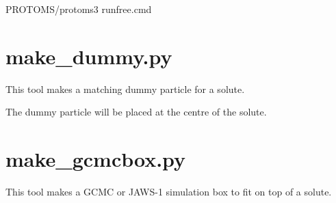 \documentclass[letterpaper,10pt,english]{sphinxmanual}
\begin{document}
%
\begin{sphinxVerbatim}[commandchars=\\\{\}]
\PYGZdl{}PROTOMS/protoms3 run\PYGZus{}free.cmd
\end{sphinxVerbatim}


\section{make\_dummy.py}
\label{\detokenize{tools:make-dummy-py}}

%
\begin{sphinxVerbatim}[commandchars=\\\{\}]
  
    
\end{sphinxVerbatim}


This tool makes a matching dummy particle for a solute.

The dummy particle will be placed at the centre of the solute.


\section{make\_gcmcbox.py}
\label{\detokenize{tools:make-gcmcbox-py}}

%
\begin{sphinxVerbatim}[commandchars=\\\{\}]
  
    
    
\end{sphinxVerbatim}


This tool makes a GCMC or JAWS-1 simulation box to fit on top of a solute.
\end{document}
